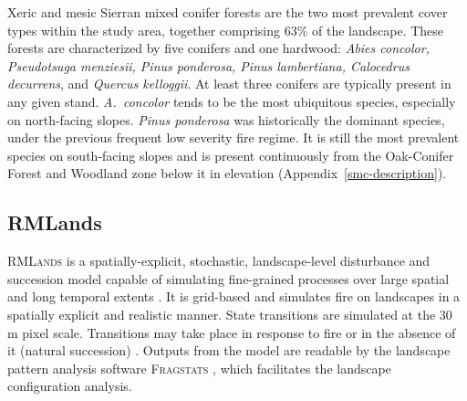 Xeric and mesic Sierran mixed conifer forests are the two most prevalent cover types within the study area, together comprising 63\% of the landscape. These forests are characterized by five conifers and one hardwood: \emph{Abies concolor, Pseudotsuga menziesii, Pinus ponderosa, Pinus lambertiana, Calocedrus decurrens}, and \emph{Quercus kelloggii}. At least three conifers are typically present in any given stand. \emph{A.~concolor} tends to be the most ubiquitous species, especially on north-facing slopes. \emph{Pinus ponderosa} was historically the dominant species, under the previous frequent low severity fire regime. It is still the most prevalent species on south-facing slopes and is present continuously from the Oak-Conifer Forest and Woodland zone below it in elevation (Appendix~\ref{smc-description}).


\subsection{RMLands}

\textsc{RMLands} is a spatially-explicit, stochastic, landscape-level disturbance and succession model capable of simulating fine-grained processes over large spatial and long temporal extents \citep{McGarigal2005}. It is grid-based and simulates fire on landscapes in a spatially explicit and realistic manner. State transitions are simulated at the 30 m pixel scale. Transitions may take place in response to fire or in the absence of it (natural succession) \citep{McGarigal2012}. Outputs from the model are readable by the landscape pattern analysis software \textsc{Fragstats} \citep{Fragstats2012}, which facilitates the landscape configuration analysis.


